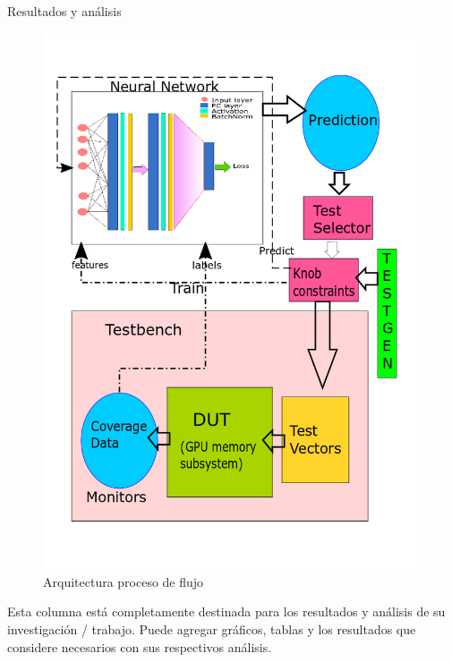 \documentclass[final]{beamer}
\newlength{\onecolwid}
\begin{document}
\begin{frame}[t]
\begin{columns}[t]
\begin{column}{\onecolwid}
\begin{block}{Resultados y análisis}
    \vspace{0.5cm}
    \begin{figure}
        \includegraphics[trim={1cm 4.8cm 2cm 3.2cm},clip,scale=0.5]{Imagen1m.png}
    \caption{Arquitectura proceso de flujo}
    \end{figure}
    
    Esta columna está completamente destinada para los resultados y análisis de su investigación / trabajo. Puede agregar gráficos, tablas y los resultados que considere necesarios con sus respectivos análisis.
    

\end{block}
\end{column}
\end{columns}
\end{frame}
\end{document}
